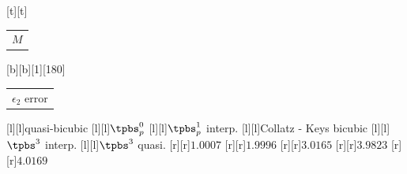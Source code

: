%    
%
%
\begin{psfrags}%
\psfragscanon%
%
[t][t]{\color[rgb]{0,0,0}\setlength{\tabcolsep}{0pt}\begin{tabular}{c}$M$\end{tabular}}%
[b][b][1][180]{\color[rgb]{0,0,0}\setlength{\tabcolsep}{0pt}\begin{tabular}{c}$\epsilon_{2}$
error\end{tabular}}%
[l][l]{\color[rgb]{0,0,0}quasi-bicubic}%
[l][l]{\color[rgb]{0,0,0}$\tpbs^0_p$}%
[l][l]{\color[rgb]{0,0,0}$\tpbs^1_p$ interp.}%
[l][l]{\color[rgb]{0,0,0}Collatz - Keys bicubic}%
[l][l]{\color[rgb]{0,0,0}$\tpbs^3$ interp.}%
[l][l]{\color[rgb]{0,0,0}$\tpbs^3$ quasi.}%
%
[r][r]{\color[rgb]{0,0,0}$1.0007$}%
[r][r]{\color[rgb]{0,0,0}$1.9996$}%
[r][r]{\color[rgb]{0,0,0}$3.0165$}%
[r][r]{\color[rgb]{0,0,0}$3.9823$}%
[r][r]{\color[rgb]{0,0,0}$4.0169$}%


\end{psfrags}
